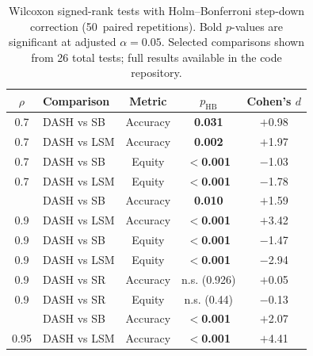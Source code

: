 \documentclass[10pt]{article}
\newcommand{\rhovar}{\rho}
\begin{document}
\begin{table}[htbp]
\centering
\caption{Wilcoxon signed-rank tests with Holm--Bonferroni step-down correction
(50~paired repetitions). Bold $p$-values are significant at adjusted
$\alpha = 0.05$. Selected comparisons shown from 26 total tests;
full results available in the code repository.}
\label{tab:significance}
\small
\begin{tabular}{clccc}
\toprule
$\rhovar$ & \textbf{Comparison} & \textbf{Metric} & $p_{\text{HB}}$ & Cohen's $d$ \\
\midrule
0.7  & DASH vs SB  & Accuracy & \textbf{0.031} & $+$0.98 \\
0.7  & DASH vs LSM & Accuracy & \textbf{0.002} & $+$1.97 \\
0.7  & DASH vs SB  & Equity   & \textbf{$<$0.001} & $-$1.03 \\
0.7  & DASH vs LSM & Equity   & \textbf{$<$0.001} & $-$1.78 \\
\addlinespace
0.9  & DASH vs SB  & Accuracy & \textbf{0.010} & $+$1.59 \\
0.9  & DASH vs LSM & Accuracy & \textbf{$<$0.001} & $+$3.42 \\
0.9  & DASH vs SB  & Equity   & \textbf{$<$0.001} & $-$1.47 \\
0.9  & DASH vs LSM & Equity   & \textbf{$<$0.001} & $-$2.94 \\
0.9  & DASH vs SR  & Accuracy & n.s. (0.926) & $+$0.05 \\
0.9  & DASH vs SR  & Equity   & n.s. (0.44) & $-$0.13 \\
\addlinespace
0.95 & DASH vs SB  & Accuracy & \textbf{$<$0.001} & $+$2.07 \\
0.95 & DASH vs LSM & Accuracy & \textbf{$<$0.001} & $+$4.41 \\
\bottomrule
\end{tabular}
\end{table}
\end{document}
